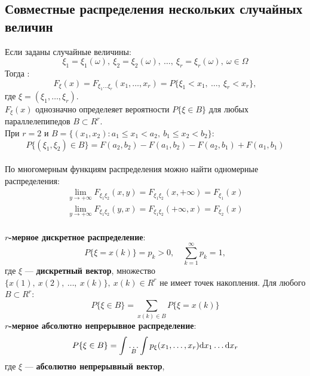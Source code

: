 \subsection{Совместные распределения нескольких случайных величин}
Если заданы случайные величины:
\begin{equation*}
    \xi_1 = \xi_1(\omega),\ \xi_2 = \xi_2(\omega),\ \ldots,\ \xi_r = \xi_r(\omega),\ \omega \in \Omega
\end{equation*}
Тогда :
\begin{equation*}
    F_\xi(x) = F_{\xi_1\ldots\xi_r}(x_1, \ldots, x_r) = P\{\xi_1 < x_1,\ \ldots,\ \xi_r < x_r\},
\end{equation*}
где $\xi = (\xi_1, \ldots, \xi_r)$.\\
$F_\xi(x)$ однозначно определеяет вероятности $P\{\xi \in B\}$ для любых параллелепипедов $B \subset R^r$.\\
При $r = 2$ и $B = \{(x_1, x_2)\colon a_1 \le x_1 < a_2,\ b_1 \le x_2 < b_2\}$:
\begin{equation*}
    P\{(\xi_1, \xi_2) \in B\} = F(a_2, b_2) - F(a_1, b_2) - F(a_2, b_1) + F(a_1, b_1)
\end{equation*}
\\
По многомерным функциям распределения можно найти одномерные распределения:
\begin{gather*}
    \lim_{y \to +\infty} F_{\xi_1 \xi_2}(x,y) = F_{\xi_1 \xi_2}(x, +\infty) = F_{\xi_1}(x)\\
    \lim_{y \to +\infty} F_{\xi_1 \xi_2}(y,x) = F_{\xi_1 \xi_2}(+\infty, x) = F_{\xi_2}(x)
\end{gather*}
\\
\textbf{$r$-мерное дискретное распределение}:
\begin{equation*}
    P\{\xi = x(k)\} = p_k > 0, \quad \sum_{k=1}^\infty p_k = 1,
\end{equation*}
где $\xi$ --- \textbf{дискретный вектор},
множество $\{x(1),\ x(2),\ \ldots,\ x(k)\},\ x(k) \in R^r$ не имеет точек накопления.
Для любого $B \subset R^r$:
\begin{equation*}
    P\{\xi \in B\} = \sum_{x(k) \in B} P\{\xi = x(k)\}
\end{equation*}
\textbf{$r$-мерное абсолютно непрерывное распределение}:
\begin{equation*}
    P\{\xi \in B\} = \int\underset{B}{\ldots}\int p_\xi(x_1, \ldots, x_r) \mathrm{d} x_1 \ldots \mathrm{d} x_r
\end{equation*}
где $\xi$ --- \textbf{абсолютно непрерывный вектор},
